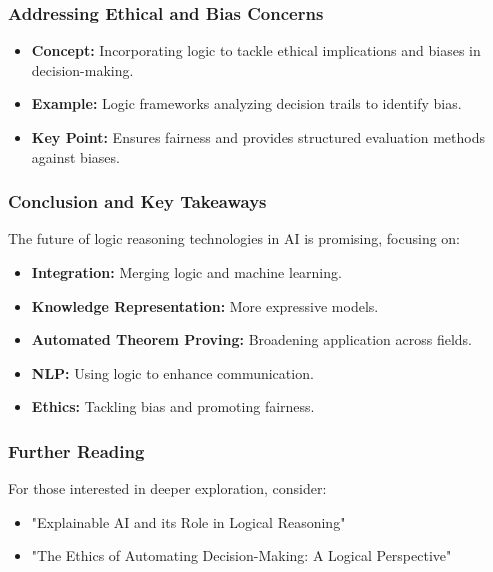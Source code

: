 \documentclass[aspectratio=169]{beamer}
\begin{document}
\begin{frame}[fragile]
    \frametitle{Addressing Ethical and Bias Concerns}
    \begin{itemize}
        \item \textbf{Concept:} Incorporating logic to tackle ethical implications and biases in decision-making.
        \item \textbf{Example:} Logic frameworks analyzing decision trails to identify bias.
        \item \textbf{Key Point:} Ensures fairness and provides structured evaluation methods against biases.
    \end{itemize}
\end{frame}

\begin{frame}[fragile]
    \frametitle{Conclusion and Key Takeaways}
    The future of logic reasoning technologies in AI is promising, focusing on:
    \begin{itemize}
        \item \textbf{Integration:} Merging logic and machine learning.
        \item \textbf{Knowledge Representation:} More expressive models.
        \item \textbf{Automated Theorem Proving:} Broadening application across fields.
        \item \textbf{NLP:} Using logic to enhance communication.
        \item \textbf{Ethics:} Tackling bias and promoting fairness.
    \end{itemize}
\end{frame}

\begin{frame}[fragile]
    \frametitle{Further Reading}
    For those interested in deeper exploration, consider:
    \begin{itemize}
        \item "Explainable AI and its Role in Logical Reasoning"
        \item "The Ethics of Automating Decision-Making: A Logical Perspective"
    \end{itemize}
\end{frame}
\end{document}
